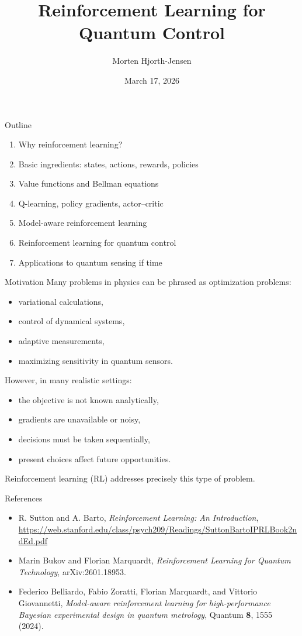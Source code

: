 \documentclass[aspectratio=169]{beamer}
\title{Reinforcement Learning for Quantum Control}
\author{Morten Hjorth-Jensen}
\date{March 17, 2026}
\begin{document}
\frame{\titlepage}

\begin{frame}{Outline}
\begin{enumerate}
\item Why reinforcement learning?
\item Basic ingredients: states, actions, rewards, policies
\item Value functions and Bellman equations
\item Q-learning, policy gradients, actor--critic
\item Model-aware reinforcement learning
\item Reinforcement learning for quantum control
\item Applications to quantum sensing if time
\end{enumerate}
\end{frame}

\begin{frame}{Motivation}
Many problems in physics can be phrased as optimization problems:
\begin{itemize}
\item variational calculations,
\item control of dynamical systems,
\item adaptive measurements,
\item maximizing sensitivity in quantum sensors.
\end{itemize}

However, in many realistic settings:
\begin{itemize}
\item the objective is not known analytically,
\item gradients are unavailable or noisy,
\item decisions must be taken sequentially,
\item present choices affect future opportunities.
\end{itemize}

Reinforcement learning (RL) addresses precisely this type of problem.
\end{frame}


\begin{frame}{References}
  \begin{itemize}
  \item R. Sutton and A. Barto, \textit{Reinforcement Learning: An Introduction}, \url{https://web.stanford.edu/class/psych209/Readings/SuttonBartoIPRLBook2ndEd.pdf}
  \item Marin Bukov and Florian Marquardt, \textit{Reinforcement Learning for Quantum Technology}, arXiv:2601.18953.
  \item  Federico Belliardo, Fabio Zoratti, Florian Marquardt, and Vittorio Giovannetti, \textit{Model-aware reinforcement learning for high-performance Bayesian experimental design in quantum metrology}, Quantum {\bf 8}, 1555 (2024).
  \end{itemize}

\end{frame}
\end{document}
